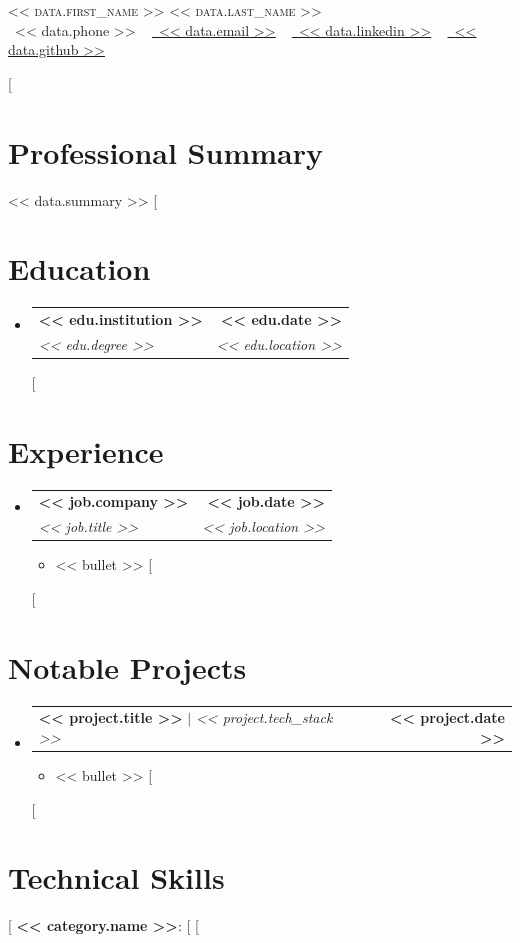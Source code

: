 \documentclass[letterpaper,11pt]{article}
\makeatletter
\newcommand{\resumeItem}[1]{\item\small{{#1 \vspace{-2pt}}}}
\newcommand{\resumeSubheading}[4]{\vspace{-2pt}\item\begin{tabular*}{1.0\textwidth}[t]{l@{\extracolsep{\fill}}r}\textbf{#1} & \textbf{\small #2} \\\textit{\small#3} & \textit{\small #4} \\\end{tabular*}\vspace{-7pt}}
\newcommand{\resumeProjectHeading}[2]{\item\begin{tabular*}{1.001\textwidth}{l@{\extracolsep{\fill}}r}\small#1 & \textbf{\small #2}\\\end{tabular*}\vspace{-7pt}}
\newcommand{\resumeSubHeadingListStart}{\begin{itemize}[leftmargin=0.0in, label={}]}
\newcommand{\resumeSubHeadingListEnd}{\end{itemize}}
\newcommand{\resumeItemListStart}{\begin{itemize}}
\newcommand{\resumeItemListEnd}{\end{itemize}\vspace{-5pt}}
\makeatother
\begin{document}
\begin{center}
    {\Huge \scshape << data.first_name >> << data.last_name >>} \\ \vspace{1pt}
    \small \raisebox{-0.1\height}\faPhone\ << data.phone >> ~ 
    \href{mailto:<< data.email >>}{\raisebox{-0.2\height}\faEnvelope\ \underline{<< data.email >>}} ~ 
    \href{https://<< data.linkedin >>}{\raisebox{-0.2\height}\faLinkedin\ \underline{<< data.linkedin >>}} ~ 
    \href{https://<< data.github >>}{\raisebox{-0.2\height}\faGithub\ \underline{<< data.github >>}}
\end{center}

[%
\section{Professional Summary}
\small{<< data.summary >>}
[%

\section{Education}
  \resumeSubHeadingListStart
    [%
    \resumeSubheading{<< edu.institution >>}{<< edu.date >>}{<< edu.degree >>}{<< edu.location >>}
    [%
  \resumeSubHeadingListEnd

\section{Experience}
  \resumeSubHeadingListStart
    [%
    \resumeSubheading{<< job.company >>}{<< job.date >>}{<< job.title >>}{<< job.location >>}
      \resumeItemListStart
        [%
        \resumeItem{<< bullet >>}
        [%
      \resumeItemListEnd
    [%
  \resumeSubHeadingListEnd

\section{Notable Projects}
  \resumeSubHeadingListStart
    [%
    \resumeProjectHeading{\textbf{<< project.title >>} $|$ \emph{<< project.tech_stack >>}}{<< project.date >>}
      \resumeItemListStart
        [%
        \resumeItem{<< bullet >>}
        [%
      \resumeItemListEnd
    [%
  \resumeSubHeadingListEnd

\section{Technical Skills}
 \begin{itemize}[leftmargin=0.15in, label={}]
    \small{\item{
     [%
     \textbf{<< category.name >>}: [%
     [%
    }}
 \end{itemize}
\end{document}
